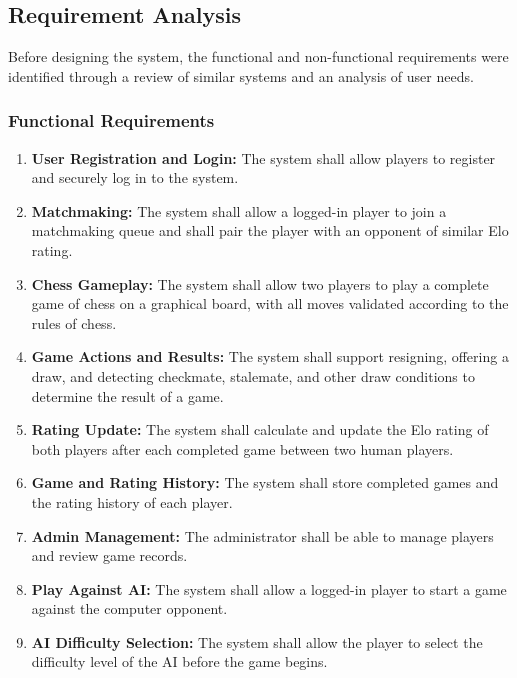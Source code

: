 \subsection{Requirement Analysis}
\label{sec:reqanalysis}

Before designing the system, the functional and non-functional requirements were identified through a review of similar systems and an analysis of user needs.

\subsubsection{Functional Requirements}

\begin{enumerate}[label=\Roman*.]
  \item \textbf{User Registration and Login:} The system shall allow players to register and securely log in to the system.

  \item \textbf{Matchmaking:} The system shall allow a logged-in player to join a matchmaking queue and shall pair the player with an opponent of similar Elo rating.

  \item \textbf{Chess Gameplay:} The system shall allow two players to play a complete game of chess on a graphical board, with all moves validated according to the rules of chess.

  \item \textbf{Game Actions and Results:} The system shall support resigning, offering a draw, and detecting checkmate, stalemate, and other draw conditions to determine the result of a game.

  \item \textbf{Rating Update:} The system shall calculate and update the Elo rating of both players after each completed game between two human players.

  \item \textbf{Game and Rating History:} The system shall store completed games and the rating history of each player.

  \item \textbf{Admin Management:} The administrator shall be able to manage players and review game records.

  \item \textbf{Play Against AI:} The system shall allow a logged-in player to start a game against the computer opponent.

  \item \textbf{AI Difficulty Selection:} The system shall allow the player to select the difficulty level of the AI before the game begins.
\end{enumerate}


